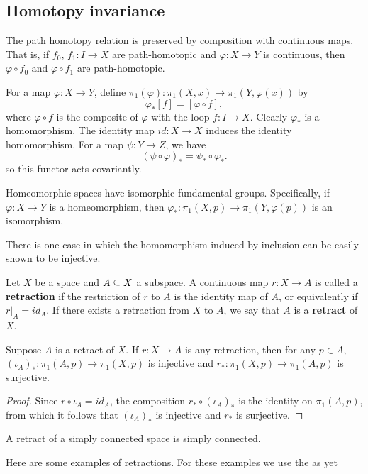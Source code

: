 \subsection{Homotopy invariance}
\begin{proposition}
The path homotopy relation is preserved by composition with continuous maps. That is, if $f_0$, $f_1:I\to X$ are path-homotopic and $\varphi:X\to Y$ is continuous, then $\varphi\circ f_0$ and $\varphi\circ f_1$ are path-homotopic.
\end{proposition}
For a map $\varphi:X\to Y$, define $\pi_1(\varphi):\pi_1(X,x)\to\pi_1(Y,\varphi(x))$ by 
\[\varphi_*[f]=[\varphi\circ f],\]
where $\varphi\circ f$ is the composite of $\varphi$ with the loop $f:I\to X$. Clearly $\varphi_*$ is a homomorphism. The identity map $id:X\to X$ induces the identity homomorphism. For a map $\psi:Y\to Z$, we have
\[(\psi\circ \varphi)_*=\psi_*\circ \varphi_*.\]
so this functor acts covariantly.
\begin{proposition}
Homeomorphic spaces have isomorphic fundamental groups. Specifically, if $\varphi:X\to Y$ is a homeomorphism, then $\varphi_*:\pi_1(X,p)\to\pi_1(Y,\varphi(p))$ is an isomorphism.
\end{proposition}
There is one case in which the homomorphism induced by inclusion
can be easily shown to be injective. 
\begin{definition}
Let $X$ be a space and $A\subseteq X$ a subspace. A continuous map $r:X\to A$ is called a \textbf{retraction} if the restriction of $r$ to $A$ is the identity map of $A$, or equivalently if $r|_A=id_A$. If there exists a retraction from $X$ to $A$, we say that $A$ is a \textbf{retract} of $X$.
\end{definition}
\begin{proposition}
Suppose $A$ is a retract of $X$. If $r:X\to A$ is any retraction,
then for any $p\in A$, $(\iota_A)_*:\pi_1(A,p)\to\pi_1(X,p)$ is injective and $r_*:\pi_1(X,p)\to\pi_1(A,p)$ is surjective.
\end{proposition}
\begin{proof}
Since $r\circ\iota_A=id_A$, the composition $r_*\circ(\iota_A)_*$ is the identity on $\pi_1(A,p)$, from which it follows that $(\iota_A)_*$ is injective and $r_*$ is surjective.
\end{proof}
\begin{corollary}\label{retract simply connected}
A retract of a simply connected space is simply connected.
\end{corollary}
Here are some examples of retractions. For these examples we use the as yet
